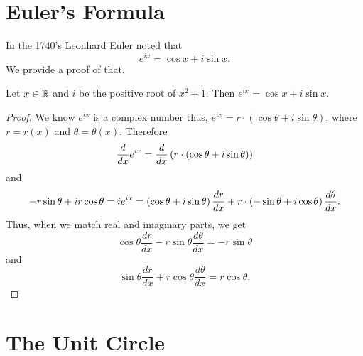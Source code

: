 \documentclass[notitlepage]{simple}
\begin{document}
\section{Euler's Formula}

In the 1740's Leonhard Euler noted that
\[
	e^{ix}=\cos x + i\sin x.
\]
We provide a proof of that.
\begin{thm}
	Let $x\in\mathbb{R}$ and $i$ be the positive root of $x^2+1$.
	Then $e^{ix} = \cos x + i \sin x$.
\end{thm}
\begin{proof}
	We know $e^{ix}$ is a complex number thus, $e^{ix}=r\cdot(\cos \theta+ i\sin \theta)$, where $r=r(x)$ and $\theta = \theta(x)$.
	Therefore
	\[
		\frac{d}{dx} e^{ix} = \frac{d}{dx}\left( r\cdot\left( \cos \theta+ i\sin \theta \right) \right)
	\]
	and
	\[
		-r\sin\theta + ir\cos\theta =
		ie^{ix} =
		\left( \cos \theta+ i\sin \theta \right)\frac{dr}{dx} + r\cdot\left( -\sin \theta+ i\cos \theta \right)\frac{d\theta}{dx}.
	\]
	Thus, when we match real and imaginary parts, we get
	\[
		\cos \theta\frac{dr}{dx} - r\sin\theta\frac{d\theta}{dx} = -r\sin\theta
	\]
	and
	\[
		\sin \theta\frac{dr}{dx} + r\cos\theta\frac{d\theta}{dx} = r\cos\theta.
	\]
\end{proof}

\section{The Unit Circle}
\end{document}
